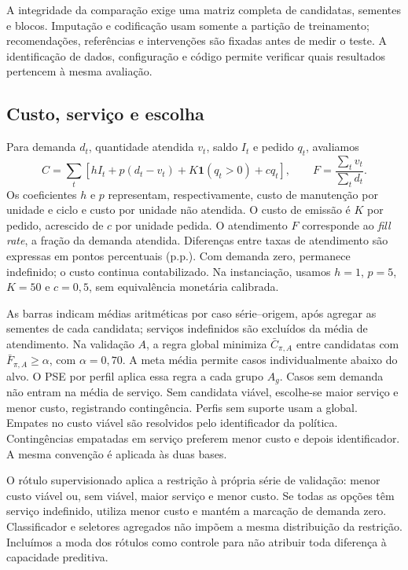 \documentclass[preprint,12pt]{elsarticle}
\begin{document}
A integridade da comparação exige uma matriz completa de candidatas, sementes e blocos. Imputação e codificação usam somente a partição de treinamento; recomendações, referências e intervenções são fixadas antes de medir o teste. A identificação de dados, configuração e código permite verificar quais resultados pertencem à mesma avaliação.

\subsection{Custo, serviço e escolha}
Para demanda $d_t$, quantidade atendida $v_t$, saldo $I_t$ e pedido $q_t$, avaliamos
\begin{equation}
 C=\sum_t[hI_t+p(d_t-v_t)+K\mathbf1(q_t>0)+cq_t],
 \qquad F=\frac{\sum_t v_t}{\sum_t d_t}.
 \label{eq:metrics}
\end{equation}
Os coeficientes $h$ e $p$ representam, respectivamente, custo de manutenção por unidade e ciclo e custo por unidade não atendida. O custo de emissão é $K$ por pedido, acrescido de $c$ por unidade pedida. O atendimento $F$ corresponde ao \textit{fill rate}, a fração da demanda atendida. Diferenças entre taxas de atendimento são expressas em pontos percentuais (p.p.). Com demanda zero, permanece indefinido; o custo continua contabilizado. Na instanciação, usamos $h=1$, $p=5$, $K=50$ e $c=0{,}5$, sem equivalência monetária calibrada.

As barras indicam médias aritméticas por caso série--origem, após agregar as sementes de cada candidata; serviços indefinidos são excluídos da média de atendimento. Na validação $A$, a regra global minimiza $\bar C_{\pi,A}$ entre candidatas com $\bar F_{\pi,A}\geq\alpha$, com $\alpha=0{,}70$. A meta média permite casos individualmente abaixo do alvo. O PSE por perfil aplica essa regra a cada grupo $A_g$. Casos sem demanda não entram na média de serviço. Sem candidata viável, escolhe-se maior serviço e menor custo, registrando contingência. Perfis sem suporte usam a global. Empates no custo viável são resolvidos pelo identificador da política. Contingências empatadas em serviço preferem menor custo e depois identificador. A mesma convenção é aplicada às duas bases.

O rótulo supervisionado aplica a restrição à própria série de validação: menor custo viável ou, sem viável, maior serviço e menor custo. Se todas as opções têm serviço indefinido, utiliza menor custo e mantém a marcação de demanda zero. Classificador e seletores agregados não impõem a mesma distribuição da restrição. Incluímos a moda dos rótulos como controle para não atribuir toda diferença à capacidade preditiva.
\end{document}
